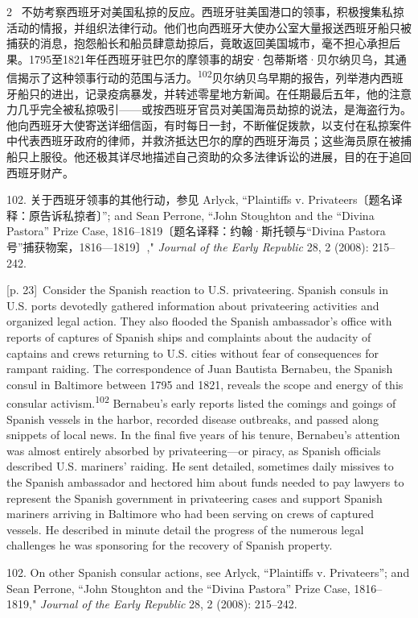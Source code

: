 \documentclass[10pt,a4paper]{article}
\begin{document}
\begin{paracol}{2}
\switchcolumn*
{\scriptsize\color{gray} [p. 23]}\ 不妨考察西班牙对美国私掠的反应。西班牙驻美国港口的领事，积极搜集私掠活动的情报，并组织法律行动。他们也向西班牙大使办公室大量报送西班牙船只被捕获的消息，抱怨船长和船员肆意劫掠后，竟敢返回美国城市，毫不担心承担后果。1795至1821年任西班牙驻巴尔的摩领事的胡安·包蒂斯塔·贝尔纳贝乌，其通信揭示了这种领事行动的范围与活\mbox{力。\textsuperscript{102}}贝尔纳贝乌早期的报告，列举港内西班牙船只的进出，记录疫病暴发，并转述零星地方新闻。在任期最后五年，他的注意力几乎完全被私掠吸引——或按西班牙官员对美国海员劫掠的说法，是海盗行为。他向西班牙大使寄送详细信函，有时每日一封，不断催促拨款，以支付在私掠案件中代表西班牙政府的律师，并救济抵达巴尔的摩的西班牙海员；这些海员原在被捕船只上服役。他还极其详尽地描述自己资助的众多法律诉讼的进展，目的在于追回西班牙财产。\par{\small 102. 关于西班牙领事的其他行动，参见 Arlyck, “Plaintiffs v. Privateers〔题名译释：原告诉私掠者〕”; and Sean Perrone, “John Stoughton and the “Divina Pastora” Prize Case, 1816–1819〔题名译释：约翰·斯托顿与“Divina Pastora号”捕获物案，1816—1819〕," \textit{Journal of the Early Republic} 28, 2 (2008): 215–242.\par}
\switchcolumn
{\scriptsize\color{gray} [p. 23]}\ Consider the Spanish reaction to U.S. privateering. Spanish consuls in U.S. ports devotedly gathered information about privateering activities and organized legal action. They also flooded the Spanish ambassador’s office with reports of captures of Spanish ships and complaints about the audacity of captains and crews returning to U.S. cities without fear of consequences for rampant raiding. The correspondence of Juan Bautista Bernabeu, the Spanish consul in Baltimore between 1795 and 1821, reveals the scope and energy of this consular activism.\nobreak\textsuperscript{102} Bernabeu’s early reports listed the comings and goings of Spanish vessels in the harbor, recorded disease outbreaks, and passed along snippets of local news. In the final five years of his tenure, Bernabeu’s attention was almost entirely absorbed by privateering—or piracy, as Spanish officials described U.S. mariners’ raiding. He sent detailed, sometimes daily missives to the Spanish ambassador and hectored him about funds needed to pay lawyers to represent the Spanish government in privateering cases and support Spanish mariners arriving in Baltimore who had been serving on crews of captured vessels. He described in minute detail the progress of the numerous legal challenges he was sponsoring for the recovery of Spanish property.\par{\small 102. On other Spanish consular actions, see Arlyck, “Plaintiffs v. Privateers”; and Sean Perrone, “John Stoughton and the “Divina Pastora” Prize Case, 1816–1819," \textit{Journal of the Early Republic} 28, 2 (2008): 215–242.\par}

\end{paracol}
\end{document}
